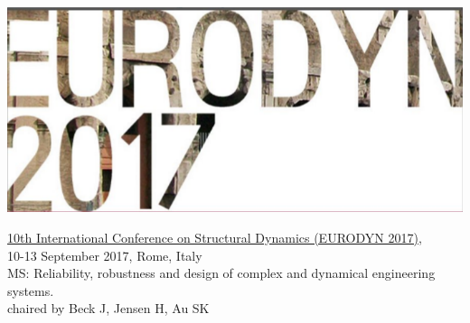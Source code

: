 \documentclass[11pt]{article}%
\begin{document}
\begin{minipage}[t]{0.15\textwidth}
\vspace{1pt}
\includegraphics[width=1\linewidth]{symposia/eurodynLogo.png}
\end{minipage}
\hspace{2pt}
\begin{minipage}[t]{0.79\textwidth}
\href{http://eurodyn2017.it/}{10th International Conference on Structural Dynamics (EURODYN 2017)},\\ 
10-13 September 2017, Rome, Italy\\
MS: Reliability, robustness and design of complex and dynamical engineering systems.\\
chaired by Beck J, Jensen H, Au SK
\end{minipage}











\end{document}
